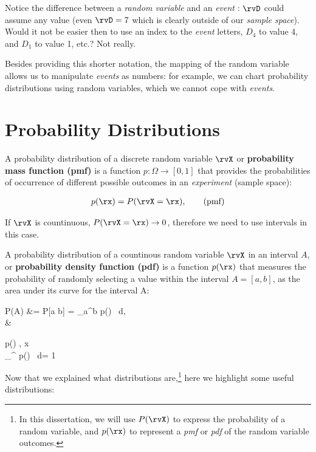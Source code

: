 Notice the difference between a \emph{random variable} and an \emph{event}
: \(\rvD\) could assume any value (even \(\rvD=7\) which is clearly outside of our \emph{sample space}). Would it not be easier then to use an index to the \emph{event} letters, \ie \(D_4\) to value 4, and \(D_1\) to value 1, etc.? Not really.

Besides providing this shorter notation, the mapping of the random variable allows us to manipulate \emph{events} as numbers: for example, we can chart probability distributions using random variables, which we cannot cope with \emph{events}.


\section{Probability Distributions}

\begin{definition}
	A probability distribution of a discrete random variable \(\rvX\) or \textbf{probability mass function (pmf)} is a function \(p: \Omega \to [0,1]\) that provides the probabilities of occurrence of different possible outcomes in an \emph{experiment} (sample space):

	\begin{align}
		p(\rx) = P(\rvX = \rx), \tag{pmf}
	\end{align}
\end{definition}

If \(\rvX\) is countinuous, \(P(\rvX=\rx)\to 0\), therefore we need to use intervals in this case.
\begin{definition}
	A probability distribution of a countinous random variable \(\rvX\) in an interval \(A\), or \textbf{probability density function (pdf)} is a function \(p(\rx)\) that measures the probability of randomly selecting a value within the interval \(A=[a, b]\), as the area under its curve for the interval A:\@
	\begin{flalign}
		P(A) &= P[a \leq \rvX \leq b] = \int_{a}^{b} p(\rx) \, d\rx, \\
		&
		\begin{cases}
			p(\rx) , \forall x \\
			\int\limits_{\Real}^{} p(\rx) \, d\rx = 1
		\end{cases}
	\end{flalign}
\end{definition}
Now that we explained what distributions are,\footnote{In this dissertation, we will use $P(\rvX)$ to express the probability of a random variable, and $p(\rx)$ to represent a \emph{pmf} or \emph{pdf} of the random variable outcomes.} here we highlight some useful distributions:
